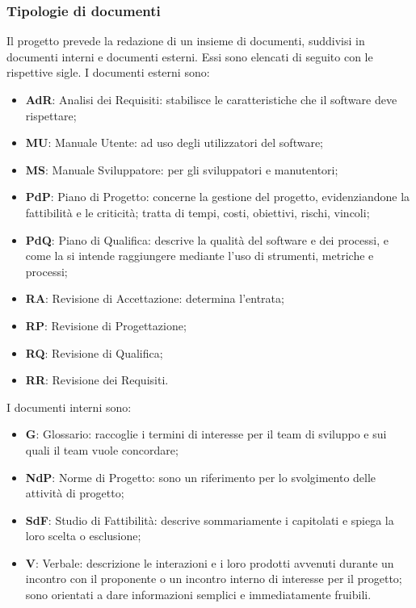 		\subsubsection{Tipologie di documenti}
		Il progetto prevede la redazione di un insieme di documenti, suddivisi in documenti interni e documenti esterni. Essi sono elencati di seguito con le rispettive sigle.\newline
		I documenti esterni sono:		
		\begin{itemize}
			\item \textbf{AdR}: Analisi dei Requisiti: stabilisce le caratteristiche che il software deve rispettare;
			\item \textbf{MU}: Manuale Utente: ad uso degli utilizzatori del software;
			\item \textbf{MS}: Manuale Sviluppatore: per gli sviluppatori e manutentori;
			\item \textbf{PdP}: Piano di Progetto: concerne la gestione del progetto, evidenziandone la fattibilità e le criticità; tratta di tempi, costi, obiettivi, rischi, vincoli;
			\item \textbf{PdQ}: Piano di Qualifica: descrive la qualità del software e dei processi, e come la si intende raggiungere mediante l'uso di strumenti, metriche e processi;
			\item \textbf{RA}: Revisione di Accettazione: determina l'entrata;
			\item \textbf{RP}: Revisione di Progettazione;
			\item \textbf{RQ}: Revisione di Qualifica;
			\item \textbf{RR}: Revisione dei Requisiti.
		\end{itemize}	
		I documenti interni sono:
		\begin{itemize}
			\item \textbf{G}: Glossario: raccoglie i termini di interesse per il team di sviluppo e sui quali il team vuole concordare;
			\item \textbf{NdP}: Norme di Progetto: sono un riferimento per lo svolgimento delle attività di progetto;
			\item \textbf{SdF}: Studio di Fattibilità: descrive sommariamente i capitolati e spiega la loro scelta o esclusione;
			\item \textbf{V}: Verbale: descrizione le interazioni e i loro prodotti avvenuti durante un incontro con il proponente o un incontro interno di interesse per il progetto; sono orientati a dare informazioni semplici e immediatamente fruibili. 
		\end{itemize}
